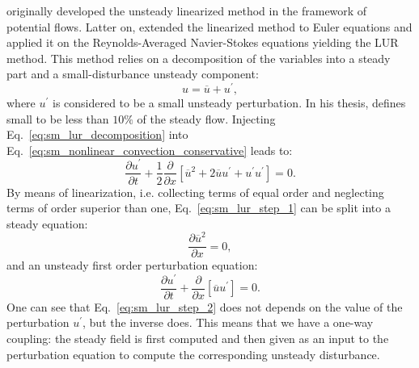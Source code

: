 
\citet{Verdon1984} originally developed the unsteady linearized 
method in the framework of potential flows. Latter on, \citet{Hall1989}
extended the linearized method to Euler equations and
\citet{Clark2000} applied it on the Reynolds-Averaged Navier-Stokes equations
yielding the LUR method.
This method relies on a decomposition of the variables
into a steady part and a small-disturbance unsteady component:
\begin{equation}
	u = \overline{u} + u^\prime,
	\label{eq:sm_lur_decomposition}
\end{equation}
where $u^\prime$ is considered to be a small unsteady perturbation. 
In his thesis,
\citet{Hall1987} defines small to be less than $10\%$ of the
steady flow.
Injecting Eq.~\ref{eq:sm_lur_decomposition} into 
Eq.~\ref{eq:sm_nonlinear_convection_conservative} leads to:
\begin{equation}
	\frac{\partial u^\prime}{\partial t} + 
	\frac{1}{2}\frac{\partial}{\partial x} \left[
	\overline{u}^2 + 2 \overline{u} u^\prime + u^\prime u^\prime \right] = 
	0.
	\label{eq:sm_lur_step_1}
\end{equation}
By means of linearization, i.e. collecting terms
of equal order and neglecting terms of order superior than one, 
Eq.~\ref{eq:sm_lur_step_1} can be split
into a steady equation:
\begin{equation}
	\frac{\partial \overline{u}^2}{\partial x} = 0,
	\label{eq:sm_lur_step_2}
\end{equation}
and an unsteady first order perturbation equation:
\begin{equation}
	\frac{\partial u^\prime}{\partial t} +
	\frac{\partial}{\partial x} \left[
	\overline{u} u^\prime \right] = 
	0.
	\label{eq:sm_lur_step_3}
\end{equation}
One can see that Eq.~\ref{eq:sm_lur_step_2} does not depends
on the value of the perturbation $u^\prime$, but the 
inverse does.
This means that we have a one-way coupling: the steady field
is first computed and then given as an input to the
perturbation equation to compute
the corresponding unsteady disturbance.

